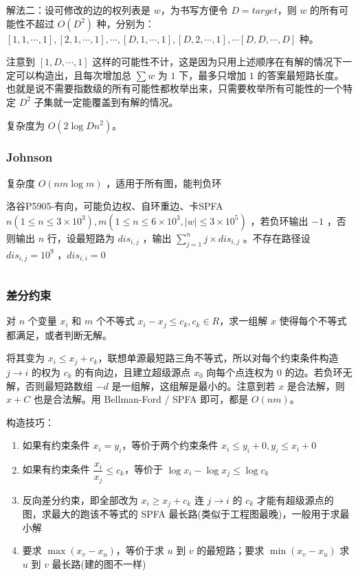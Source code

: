 \documentclass[twocolumn,10pt]{ctexart}
\begin{document}
解法二：设可修改的边的权列表是 $w$，为书写方便令 $D=target$，则 $w$ 的所有可能性不超过 $O(D^2)$ 种，分别为：$[1,\allowbreak{}1,\allowbreak{}\cdots,\allowbreak{}1],\allowbreak{}[2,\allowbreak{}1,\allowbreak{}\cdots,\allowbreak{}1],\allowbreak{}\cdots,\allowbreak{}[D,\allowbreak{}1,\allowbreak{}\cdots,\allowbreak{}1],\allowbreak{}[D,\allowbreak{}2,\allowbreak{}\cdots,\allowbreak{}1],\allowbreak{}\cdots[D,\allowbreak{}D,\allowbreak{}\cdots,\allowbreak{}D]$ 种。

注意到 $[1,D,\cdots,1]$ 这样的可能性不计，这是因为只用上述顺序在有解的情况下一定可以构造出，且每次增加总 $\sum w$ 为 $1$ 下，最多只增加 $1$ 的答案最短路长度。也就是说不需要指数级的所有可能性都枚举出来，只需要枚举所有可能性的一个特定 $D^2$ 子集就一定能覆盖到有解的情况。

复杂度为 $O(2\log Dn^2)$。

\subsubsection{Johnson}

复杂度 $O(nm\log m)$ ，适用于所有图，能判负环

\begin{notebox}
洛谷P5905-有向，可能负边权、自环重边、卡SPFA $n(1\le n\le3\times10^3),\allowbreak{}m(1\le n\le6\times10^3,\allowbreak{}|w|\le3\times10^5)$ ，若负环输出 $-1$ ，否则输出 $n$ 行，设最短路为 $dis_{i,j}$ ，输出 $\sum_{j=1}^nj\times dis_{i,j}$ 。不存在路径设 $dis_{i,j}=10^9$  ，$dis_{i,i}=0$
\end{notebox}

\inputminted{cpp}{code/p5905_johnson.cpp}

\subsubsection{差分约束}

对 $n$ 个变量 $x_i$ 和 $m$ 个不等式 $x_i-x_j\le c_k,c_k\in R$，求一组解 $x$ 使得每个不等式都满足，或者判断无解。

将其变为 $x_i\le x_j+c_k$，联想单源最短路三角不等式，所以对每个约束条件构造 $j\to i$ 的权为 $c_k$ 的有向边，且建立超级源点 $x_0$ 向每个点连权为 $0$ 的边。若负环无解，否则最短路数组 $-d$ 是一组解，这组解是最小的。注意到若 $x$ 是合法解，则 $x+C$ 也是合法解。用 Bellman-Ford / SPFA 即可，都是 $O(nm)$。

构造技巧：

\begin{enumerate}
\item 如果有约束条件 $x_i=y_i$，等价于两个约束条件 $x_i\le y_i+0,y_i\le x_i+0$
\item 如果有约束条件 $\dfrac{x_i}{x_j}\le c_k$，等价于 $\log x_i-\log x_j\le\log c_k$
\item 反向差分约束，即全部改为 $x_i\ge x_j+c_k$ 连 $j\to i$ 的 $c_k$ 才能有超级源点的图，求最大的跑该不等式的 SPFA 最长路(类似于工程图最晚)，一般用于求最小解
\item 要求 $\max(x_v-x_u)$，等价于求 $u$ 到 $v$ 的最短路；要求 $\min(x_v-x_u)$ 求 $u$ 到 $v$ 最长路(建的图不一样)
\end{enumerate}
\end{document}
